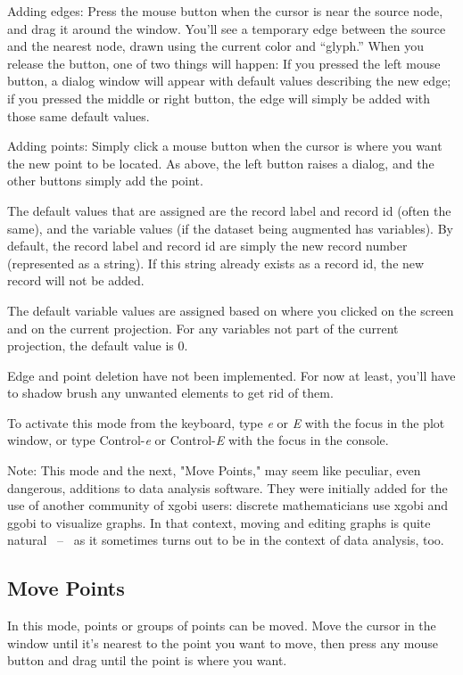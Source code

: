 \documentclass[11pt]{article}
\begin{document}
Adding edges:  Press the mouse button when the cursor is near the
source node, and drag it around the window.  You'll see a temporary
edge between the source and the nearest node, drawn using the current
color and ``glyph.''  When you release the button, one of two things
will happen:  If you pressed the left mouse button, a dialog window
will appear with default values describing the new edge; if you
pressed the middle or right button, the edge will simply be added
with those same default values.

Adding points:  Simply click a mouse button when the cursor is
where you want the new point to be located.  As above, the left
button raises a dialog, and the other buttons simply add the point.

The default values that are assigned are the record label and record
id (often the same), and the variable values (if the dataset being
augmented has variables).  By default, the record label and record id
are simply the new record number (represented as a string).  If this
string already exists as a record id, the new record will not be added.

The default variable values are assigned based on where you clicked
on the screen and on the current projection.  For any variables not
part of the current projection, the default value is 0.

Edge and point deletion have not been implemented.  For now at
least, you'll have to shadow brush any unwanted elements to get
rid of them.

To activate this mode from the keyboard, type {\em e} or {\em E}
with the focus in the plot window, or type Control-{\em e} or
Control-{\em E} with the focus in the console.

Note: This mode and the next, "Move Points," may seem like peculiar,
even dangerous, additions to data analysis software.  They were
initially added for the use of another community of xgobi users:
discrete mathematicians use xgobi and ggobi to visualize graphs.  In
that context, moving and editing graphs is quite natural ~--~ as it
sometimes turns out to be in the context of data analysis, too.

\subsection{Move Points}
\label{slbl:MovePoints}

In this mode, points or groups of points can be moved.  Move
the cursor in the window until it's nearest to the point you
want to move, then press any mouse button and drag until the
point is where you want.
\end{document}
